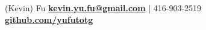 \documentclass[letterpaper]{kevin-resume} %
\begin{document}


 {(Kevin) Fu} { %
	\hspace{6mm}\href{kevin.yu.fu@gmail.com} {\textbf{kevin.yu.fu@gmail.com}} | 416-903-2519 \\ %
	\hspace{6mm}\href{https://github.com/yufutotg} {\textbf{github.com/yufutotg}} %
}

\end{document}
